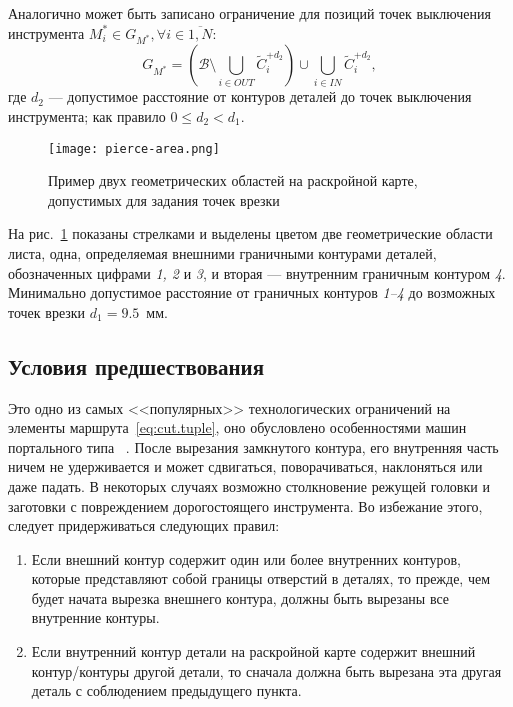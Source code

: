 Аналогично может быть записано ограничение для
позиций точек выключения инструмента
$M^*_i \in G_{M^*}, \forall i \in \overline{1, N}$:
\begin{equation}
  \label{eq:cut.off}
  G_{M^*} = \left(\mathcal B \setminus \bigcup_{i \in OUT} \widetilde C_i^{+d_2} \right)
  \cup \bigcup_{i \in IN} \widetilde C_i^{+d_2}
  ,
\end{equation}
где
$d_2$ --- допустимое расстояние
от контуров деталей до точек выключения инструмента;
как правило
$0 \leqslant d_2 < d_1$.

\begin{figure}
  \centering
  \texttt{[image: pierce-area.png]}
  \caption{
    Пример двух геометрических областей на раскройной карте,
    допустимых для задания точек врезки
  }
  \label{fig:cut.pierce-area}
\end{figure}

На рис.~\ref{fig:cut.pierce-area}
показаны стрелками и выделены цветом
две геометрические области листа,
одна, определяемая
внешними граничными контурами деталей,
обозначенных цифрами
\textit{1, 2} и \textit{3},
и вторая ---
внутренним граничным контуром
\textit{4}.
Минимально допустимое расстояние
от граничных контуров
\textit{1--4} до возможных точек врезки
$d_1=9.5$~мм.

\subsection{Условия предшествования}
\label{sec:cut.PC}

Это одно из самых <<популярных>>
технологических ограничений на элементы
маршрута~\eqref{eq:cut.tuple},
оно обусловлено особенностями машин портального типа
~\cite{bi:Petunin2,bi:dewil-review,bi:Dewil2015}.
После вырезания замкнутого контура,
его внутренняя часть ничем не удерживается и может сдвигаться,
поворачиваться, наклоняться или даже падать.
В некоторых случаях возможно столкновение
режущей головки и заготовки с повреждением дорогостоящего инструмента.
Во избежание этого, следует придерживаться следующих правил:
\begin{enumerate}
  \item
  Если внешний контур содержит один или более внутренних контуров,
  которые представляют собой границы отверстий в деталях,
  то прежде, чем будет начата вырезка внешнего контура,
  должны быть вырезаны все
  внутренние контуры.
  \item
  Если внутренний контур детали на раскройной карте содержит внешний контур/контуры другой детали,
  то сначала должна быть вырезана эта другая деталь с соблюдением предыдущего пункта.
\end{enumerate}

